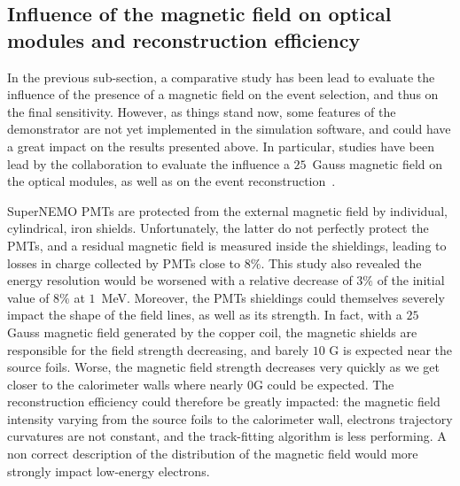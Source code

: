 
\subsection{Influence of the magnetic field on optical modules and reconstruction efficiency}

In the previous sub-section, a comparative study has been lead to evaluate the influence of the presence of a magnetic field on the event selection, and thus on the final sensitivity.
However, as things stand now, some features of the demonstrator are not yet implemented in the simulation software, and could have a great impact on the results presented above.
In particular, studies have been lead by the collaboration to evaluate the influence a $25$~Gauss magnetic field on the optical modules, as well as on the event reconstruction~\cite{CalvezThesis}\cite{internal:magnetic_field}.

SuperNEMO PMTs are protected from the external magnetic field by individual, cylindrical, iron shields.
Unfortunately, the latter do not perfectly protect the PMTs, and a residual magnetic field is measured inside the shieldings, leading to losses in charge collected by PMTs close to $8\%$.
This study also revealed the energy resolution would be worsened with a relative decrease of $3\%$ of the initial value of $8\%$ at $1$~MeV.
Moreover, the PMTs shieldings could themselves severely impact the shape of the field lines, as well as its strength.
In fact, with a $25$ Gauss magnetic field generated by the copper coil, the magnetic shields are responsible for the field strength decreasing, and barely $10$ G is expected near the source foils.
Worse, the magnetic field strength decreases very quickly as we get closer to the calorimeter walls where nearly 0G could be expected.
The reconstruction efficiency could therefore be greatly impacted:
the magnetic field intensity varying from the source foils to the calorimeter wall, electrons trajectory curvatures are not constant, and the track-fitting algorithm is less performing.
A non correct description of the distribution of the magnetic field would more strongly impact low-energy electrons.

